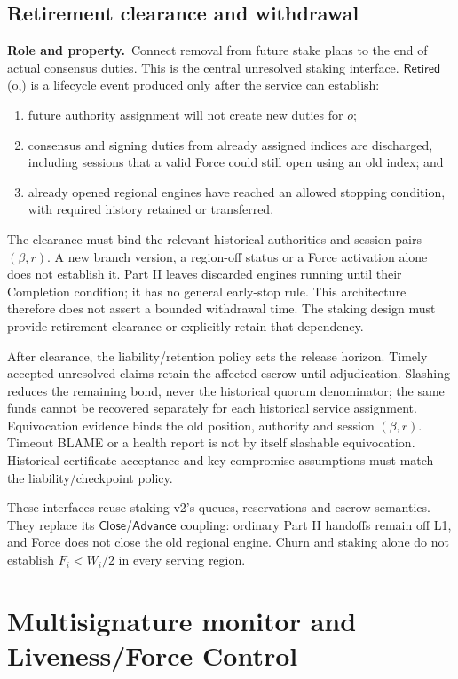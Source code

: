 \documentclass[11pt,a4paper]{article}
\newcommand{\api}[1]{\ensuremath{\mathsf{#1}}}
\newcommand{\role}{\textbf{Role and property.}\ }
\begin{document}
\subsection{Retirement clearance and withdrawal}\label{sec:retirement}
\role Connect removal from future stake plans to the end of actual
consensus duties. This is the central unresolved staking interface.
\api{Retired}(o,) is a lifecycle event produced only after
the service can establish:
\begin{enumerate}
\item future authority assignment will not create new duties for $o$;
\item consensus and signing duties from already assigned indices are
discharged, including
sessions that a valid Force could still open using an old index; and
\item already opened regional engines have reached an allowed stopping
condition, with required history retained or transferred.
\end{enumerate}
The clearance must bind the relevant historical authorities and session pairs
$(\beta,r)$. A new branch version, a region-off status or a Force
activation alone does not establish it. Part II leaves discarded engines running until their
Completion condition; it has no general early-stop rule. This architecture
therefore does not assert a bounded withdrawal time. The staking design must
provide retirement clearance or explicitly retain that dependency.

After clearance, the liability/retention policy sets the release horizon.
Timely accepted unresolved claims retain the affected escrow until
adjudication. Slashing reduces the remaining bond, never the historical
quorum denominator; the same funds cannot be recovered separately for each historical
service assignment. Equivocation evidence binds the old position,
authority and session $(\beta,r)$. Timeout BLAME or a health report is not by
itself slashable equivocation. Historical certificate acceptance and
key-compromise assumptions must match the liability/checkpoint policy.

These interfaces reuse staking v2's queues, reservations and escrow
semantics. They replace its \api{Close}/\api{Advance} coupling: ordinary
Part II handoffs remain off L1, and Force does not close the old regional
engine. Churn and staking alone do not establish $F_i<W_i/2$ in every
serving region.

\section{Multisignature monitor and Liveness/Force Control}\label{sec:force}
\end{document}
